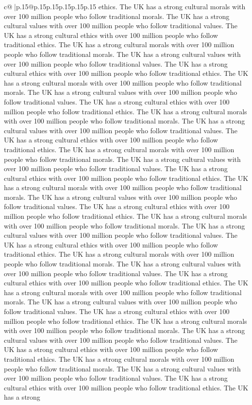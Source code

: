 \documentclass{article}
\begin{document}
{\begin{supertabular}{c@{$\;$}|p{.15\linewidth}@{}p{.15\linewidth}p{.15\linewidth}p{.15\linewidth}p{.15\linewidth}p{.15\linewidth}}
{{{ethics. The UK has a strong cultural morals with over 100 million people who follow traditional morals. The UK has a strong cultural values with over 100 million people who follow traditional values. The UK has a strong cultural ethics with over 100 million people who follow traditional ethics. The UK has a strong cultural morals with over 100 million people who follow traditional morals. The UK has a strong cultural values with over 100 million people who follow traditional values. The UK has a strong cultural ethics with over 100 million people who follow traditional ethics. The UK has a strong cultural morals with over 100 million people who follow traditional morals. The UK has a strong cultural values with over 100 million people who follow traditional values. The UK has a strong cultural ethics with over 100 million people who follow traditional ethics. The UK has a strong cultural morals with over 100 million people who follow traditional morals. The UK has a strong cultural values with over 100 million people who follow traditional values. The UK has a strong cultural ethics with over 100 million people who follow traditional ethics. The UK has a strong cultural morals with over 100 million people who follow traditional morals. The UK has a strong cultural values with over 100 million people who follow traditional values. The UK has a strong cultural ethics with over 100 million people who follow traditional ethics. The UK has a strong cultural morals with over 100 million people who follow traditional morals. The UK has a strong cultural values with over 100 million people who follow traditional values. The UK has a strong cultural ethics with over 100 million people who follow traditional ethics. The UK has a strong cultural morals with over 100 million people who follow traditional morals. The UK has a strong cultural values with over 100 million people who follow traditional values. The UK has a strong cultural ethics with over 100 million people who follow traditional ethics. The UK has a strong cultural morals with over 100 million people who follow traditional morals. The UK has a strong cultural values with over 100 million people who follow traditional values. The UK has a strong cultural ethics with over 100 million people who follow traditional ethics. The UK has a strong cultural morals with over 100 million people who follow traditional morals. The UK has a strong cultural values with over 100 million people who follow traditional values. The UK has a strong cultural ethics with over 100 million people who follow traditional ethics. The UK has a strong cultural morals with over 100 million people who follow traditional morals. The UK has a strong cultural values with over 100 million people who follow traditional values. The UK has a strong cultural ethics with over 100 million people who follow traditional ethics. The UK has a strong cultural morals with over 100 million people who follow traditional morals. The UK has a strong cultural values with over 100 million people who follow traditional values. The UK has a strong cultural ethics with over 100 million people who follow traditional ethics. The UK has a strong }}}
\end{supertabular}}
\end{document}
